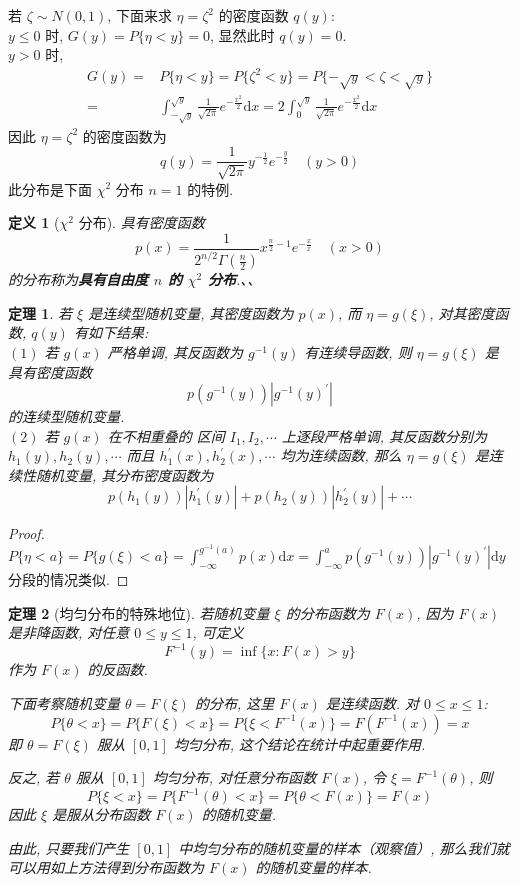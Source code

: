 \documentclass[12pt,a4paper]{article}
\newtheorem{thm}{定理}[subsection]  %
\newtheorem{definition}{定义}[subsection] %
\begin{document}
若 $\zeta \sim N(0,1)$, 下面来求 $\eta = \zeta^2$ 的密度函数 $q(y)$:\\
$y\leq 0$ 时, $G(y) = P\{\eta < y\} = 0$, 显然此时 $q(y) = 0$.\\
$y > 0$ 时, 
\[\begin{aligned}
    G(y) = & P\{\eta < y\} = P\{\zeta^2 < y\} = P\{-\sqrt{y} < \zeta < \sqrt{y}\} \\
= & \int_{-\sqrt{y}}^{\sqrt{y}} \frac{1}{\sqrt{2\pi}}e^{-\frac{x^2}{2}} \mathrm{d}x = 2\int_0^{\sqrt{y}} \frac{1}{\sqrt{2\pi}}e^{-\frac{x^2}{2}} \mathrm{d}x
\end{aligned}\]
因此 $\eta = \zeta^2$ 的密度函数为\[q(y) = \frac{1}{\sqrt{2\pi}} y^{-\frac{1}{2}}e^{-\frac{y}{2}} \quad (y > 0) \]
此分布是下面 $\chi^2$ 分布 $n=1$ 的特例.
\begin{definition}[$\chi^2$ 分布]
    具有密度函数\[p(x) = \frac{1}{2^{n/2} \Gamma(\frac{n}{2})} x^{\frac{n}{2}-1}e^{-\frac{x}{x}}\quad (x>0)\]
    的分布称为\textbf{具有自由度 $n$ 的 $\chi^2$ 分布}.、、
\end{definition}
\begin{thm}
    若 $\xi$ 是连续型随机变量, 其密度函数为 $p(x)$, 而 $\eta = g(\xi)$, 对其密度函数, $q(y)$ 有如下结果:\\
    $(1)$ 若 $g(x)$ 严格单调, 其反函数为 $g^{-1}(y)$ 有连续导函数, 则 $\eta = g(\xi)$ 是具有密度函数\[p(g^{-1}(y))|g^{-1}(y)^{\prime}|\]
    的连续型随机变量.\\
    $(2)$ 若 $g(x)$ 在不相重叠的 区间 $I_1, I_2, \cdots$ 上逐段严格单调, 其反函数分别为 $h_1(y), h_2(y), \cdots$ 而且 
    $h^{\prime}_1(x), h^{\prime}_2(x), \cdots$ 均为连续函数, 那么 $\eta = g(\xi)$ 是连续性随机变量, 其分布密度函数为
    \[p(h_1(y)) |h_1^{\prime}(y)| + p(h_2(y))|h_2^{\prime}(y)| + \cdots\] 
\end{thm}
\begin{proof}
    $P\{\eta < a\} = P\{g(\xi) < a\} = \int_{-\infty}^{g^{-1}(a)} p(x) \mathrm{d} x = \int_{-\infty}^a p(g^{-1}(y)) |g^{-1}(y)^{\prime}| \mathrm{d}y$ 
    分段的情况类似.
\end{proof}
\begin{thm}[均匀分布的特殊地位]
    若随机变量 $\xi$ 的分布函数为 $F(x)$, 因为 $F(x)$ 是非降函数, 对任意 $0 \leq y \leq 1$, 可定义 
    \[F^{-1}(y) = \inf\{x: F(x)>y\} \]作为 $F(x)$ 的反函数.

    下面考察随机变量 $\theta = F(\xi)$ 的分布, 这里 $F(x)$ 是连续函数. 对 $0 \leq x \leq 1$:
    \[P\{\theta < x\} = P\{F(\xi) < x\} = P\{\xi < F^{-1}(x)\} = F(F^{-1}(x)) = x\]
    即 $\theta = F(\xi)$ 服从 $[0,1]$ 均匀分布, 这个结论在统计中起重要作用.

    反之, 若 $\theta$ 服从 $[0,1]$ 均匀分布, 对任意分布函数 $F(x)$, 令 $\xi = F^{-1}(\theta)$, 则
    \[P\{\xi<x\} = P\{F^{-1}(\theta)<x\} = P\{\theta<F(x)\} = F(x)\]
    因此 $\xi$ 是服从分布函数 $F(x)$ 的随机变量.

    由此, 只要我们产生 $[0,1]$ 中均匀分布的随机变量的样本（观察值）, 那么我们就可以用如上方法得到分布函数为 $F(x)$ 的随机变量的样本. 
\end{thm}
\end{document}
